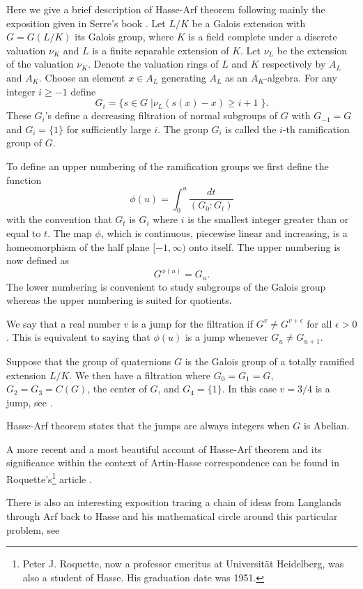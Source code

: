 \documentclass[12pt]{amsart}
\begin{document}
Here we give a brief description of Hasse-Arf theorem following mainly the exposition given in Serre's book \cite{serre-local}. Let $L/K$ be a Galois extension with $G=G(L/K)$ its Galois group, where $K$ is a field complete under a discrete valuation $\nu_K$ and $L$ is a finite separable extension of $K$.
Let $\nu_L$ be the extension of the valuation $\nu_K$. Denote the valuation rings of $L$ and $K$ respectively by $A_L$ and $A_K$. Choose an element $x\in A_L$ generating $A_L$ as an $A_K$-algebra.
For any integer $i\geq -1$ define
\[ G_i=\{ s\in G\; |  \nu_L(s(x)-x)\geq i+1 \; \} . \]
These $G_i$'s define a decreasing filtration of normal subgroups of $G$ with $G_{-1}=G$ and $G_i=\{ 1\}$ for sufficiently large $i$. The group $G_i$ is called the $i$-th ramification group of $G$.

To define an upper numbering of the ramification groups we first define the function
\[ \phi(u)=\int_0^u \frac{dt}{(G_0:G_t)} \]
with the convention that $G_t$ is $G_i$ where $i$ is the smallest integer greater than or equal to $t$. The map $\phi$, which is continuous, piecewise linear and increasing, is a homeomorphism of the half plane $[-1,\infty)$ onto itself. The upper numbering is now defined as
\[ G^{\phi(u)}=G_u. \]
The lower numbering is convenient to study subgroups of the Galois group whereas the upper numbering is suited for quotients.

We say that a real number $v$ is a jump for the filtration if $G^v\neq G^{v+\epsilon}$ for all $\epsilon>0$. This is equivalent to saying that $\phi(u)$ is a jump whenever $G_u\neq G_{u+1}$.

Suppose that the group of quaternions $G$ is the Galois group of a totally ramified extension $L/K$. We then have a filtration where $G_0=G_1=G$, $G_2=G_3=C(G)$, the center of $G$, and $G_4=\{ 1\}$. In this case $v=3/4$ is a jump, see \cite[p77]{serre-local}.

Hasse-Arf theorem states that the jumps are always integers when $G$ is Abelian.

A more recent and a most beautiful account of Hasse-Arf theorem and its significance within the context of Artin-Hasse correspondence can be found in Roquette's\footnote{Peter J. Roquette, now a professor emeritus at Universit\"{a}t Heidelberg, was also a student of Hasse. His graduation date was 1951.} article \cite{roquette}.

There is also an interesting exposition tracing a chain of ideas from Langlands through Arf back to Hasse and his mathematical circle around this particular problem, see \cite{roquette2}
\end{document}
